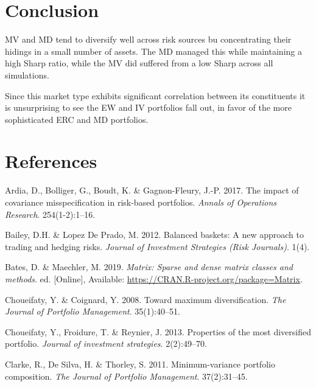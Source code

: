 \documentclass[11pt,preprint, authoryear]{elsarticle}
\numberwithin{equation}{section}
\numberwithin{figure}{section}
\numberwithin{table}{section}
\begin{document}
\hypertarget{conclusion}{%
\section{\texorpdfstring{Conclusion
\label{conclusion}}{Conclusion }}\label{conclusion}}

MV and MD tend to diversify well across risk sources bu concentrating
their hidings in a small number of assets. The MD managed this while
maintaining a high Sharp ratio, while the MV did suffered from a low
Sharp across all simulations.

Since this market type exhibits significant correlation between its
constituents it is unsurprising to see the EW and IV portfolios fall
out, in favor of the more sophisticated ERC and MD portfolios.

\newpage

\hypertarget{references}{%
\section*{References}\label{references}}

\hypertarget{refs}{}
\leavevmode\hypertarget{ref-ardia2017}{}%
Ardia, D., Bolliger, G., Boudt, K. \& Gagnon-Fleury, J.-P. 2017. The
impact of covariance misspecification in risk-based portfolios.
\emph{Annals of Operations Research}. 254(1-2):1--16.

\leavevmode\hypertarget{ref-lopez2012}{}%
Bailey, D.H. \& Lopez De Prado, M. 2012. Balanced baskets: A new
approach to trading and hedging risks. \emph{Journal of Investment
Strategies (Risk Journals)}. 1(4).

\leavevmode\hypertarget{ref-Matrix}{}%
Bates, D. \& Maechler, M. 2019. \emph{Matrix: Sparse and dense matrix
classes and methods}. ed. {[}Online{]}, Available:
\url{https://CRAN.R-project.org/package=Matrix}.

\leavevmode\hypertarget{ref-choueifaty2008}{}%
Choueifaty, Y. \& Coignard, Y. 2008. Toward maximum diversification.
\emph{The Journal of Portfolio Management}. 35(1):40--51.

\leavevmode\hypertarget{ref-choueifaty2013}{}%
Choueifaty, Y., Froidure, T. \& Reynier, J. 2013. Properties of the most
diversified portfolio. \emph{Journal of investment strategies}.
2(2):49--70.

\leavevmode\hypertarget{ref-clarke2011}{}%
Clarke, R., De Silva, H. \& Thorley, S. 2011. Minimum-variance portfolio
composition. \emph{The Journal of Portfolio Management}. 37(2):31--45.
\end{document}
